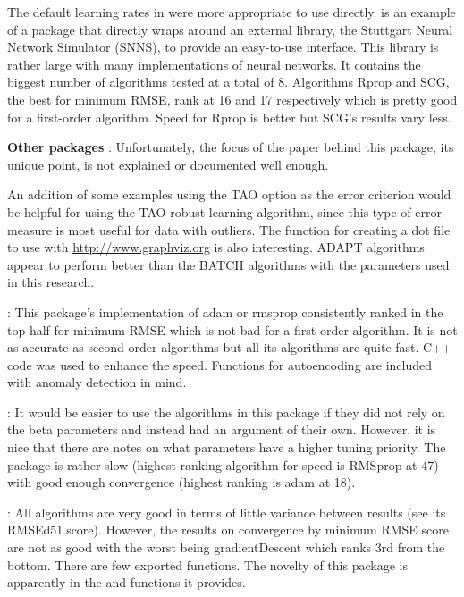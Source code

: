 The default learning rates in  \citep{R-RSNNS} were more
appropriate to use directly.  is an example of a package
that directly wraps around an external library, the Stuttgart Neural
Network Simulator (SNNS), to provide an easy-to-use interface. This
library is rather large with many implementations of neural networks. It
contains the biggest number of algorithms tested at a total of 8.
Algorithms Rprop and SCG, the best for minimum RMSE, rank at 16 and 17
respectively which is pretty good for a first-order algorithm. Speed for
Rprop is better but SCG's results vary less.

\textbf{Other packages }  \citep{R-AMORE}: Unfortunately,
the focus of the paper behind this package, its unique point, is not
explained or documented well enough.

An addition of some examples using the TAO option as the error criterion
would be helpful for using the TAO-robust learning algorithm, since this
type of error measure is most useful for data with outliers. The
function for creating a dot file to use with
\url{http://www.graphviz.org} is also interesting. ADAPT algorithms
appear to perform better than the BATCH algorithms with the parameters
used in this research.

 \citep{R-ANN2}: This package's implementation of adam or
rmsprop consistently ranked in the top half for minimum RMSE which is
not bad for a first-order algorithm. It is not as accurate as
second-order algorithms but all its algorithms are quite fast.
\textsf{C++} code was used to enhance the speed. Functions for
autoencoding are included with anomaly detection in mind.

 \citep{R-automl}: It would be easier to use the
algorithms in this package if they did not rely on the beta parameters
and instead had an argument of their own. However, it is nice that there
are notes on what parameters have a higher tuning priority. The package
is rather slow (highest ranking algorithm for speed is RMSprop at 47)
with good enough convergence (highest ranking is adam at 18).

 \citep{R-deepdive}: All algorithms are very good in
terms of little variance between results (see its RMSEd51.score).
However, the results on convergence by minimum RMSE score are not as
good with the worst being gradientDescent which ranks 3rd from the
bottom. There are few exported functions. The novelty of this package is
apparently in the  and  functions it
provides.

